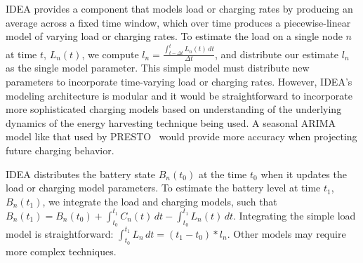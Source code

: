 IDEA provides a component that models load or charging rates by producing an
average across a fixed time window, which over time produces a piecewise-linear
model of varying load or charging rates. To estimate the load on a single
node $n$ at time $t$, $L_n(t)$, we compute $l_n = \frac{\int_{t - \Delta
t}^t \!  L_n(t)\, dt}{\Delta t}$, and distribute our estimate $l_n$ as the
single model parameter. This simple model must distribute new parameters to
incorporate time-varying load or charging rates. However, IDEA's modeling
architecture is modular and it would be straightforward to incorporate more
sophisticated charging models based on understanding of the underlying
dynamics of the energy harvesting technique being used. A seasonal ARIMA
model like that used by PRESTO~\cite{presto-TON} would provide more accuracy
when projecting future charging behavior.


IDEA distributes the battery state $B_n(t_0)$ at the time $t_0$ when it
updates the load or charging model parameters. To estimate the battery level
at time $t_1$, $B_n(t_1)$, we integrate the load and charging models, such
that $B_n(t_1) = B_n(t_0) + \int_{t_0}^{t_1} \! C_n(t) \, dt -
\int_{t_0}^{t_1} \! L_n(t) \, dt$.  Integrating the simple load model is
straightforward: $\int_{t_0}^{t_1} \!  L_n \, dt = \left( t_1 - t_0
\right) * l_n$. Other models may require more complex techniques.

